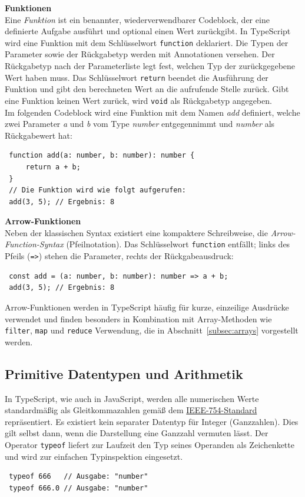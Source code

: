 \textbf{Funktionen}\\
Eine \textit{Funktion} ist ein benannter, wiederverwendbarer Codeblock, der eine definierte Aufgabe ausführt und optional einen Wert zurückgibt. In TypeScript wird eine Funktion mit dem Schlüsselwort \texttt{function} deklariert. Die Typen der Parameter sowie der Rückgabetyp werden mit Annotationen versehen. Der Rückgabetyp nach der Parameterliste legt fest, welchen Typ der zurückgegebene Wert haben muss. Das Schlüsselwort \texttt{return} beendet die Ausführung der Funktion und gibt den berechneten Wert an die aufrufende Stelle zurück. Gibt eine Funktion keinen Wert zurück, wird \texttt{void} als Rückgabetyp angegeben.\\
Im folgenden Codeblock wird eine Funktion mit dem Namen \emph{add} definiert, welche zwei Parameter \emph{a} und \emph{b} vom Type \emph{number} entgegennimmt und \emph{number} als Rückgabewert hat:
\begin{verbatim}
 function add(a: number, b: number): number {
     return a + b;
 }
 // Die Funktion wird wie folgt aufgerufen:
 add(3, 5); // Ergebnis: 8
\end{verbatim}


\textbf{Arrow-Funktionen}\\
Neben der klassischen Syntax existiert eine kompaktere Schreibweise, die \textit{Arrow-Function-Syntax} (Pfeilnotation). Das Schlüsselwort \texttt{function} entfällt; links des Pfeils (\texttt{=>}) stehen die Parameter, rechts der Rückgabeausdruck:
\begin{verbatim}
 const add = (a: number, b: number): number => a + b;
 add(3, 5); // Ergebnis: 8
\end{verbatim}

Arrow-Funktionen werden in TypeScript häufig für kurze, einzeilige Ausdrücke verwendet und finden besonders in Kombination mit Array-Methoden wie \texttt{filter}, \texttt{map} und \texttt{reduce} Verwendung, die in Abschnitt~\ref{subsec:arrays} vorgestellt werden.


\subsection{Primitive Datentypen und Arithmetik}
\label{subsec:arithmetik}
In TypeScript, wie auch in JavaScript, werden alle numerischen Werte standardmäßig als Gleitkommazahlen gemäß dem \href{https://de.wikipedia.org/wiki/IEEE_754}{IEEE-754-Standard} repräsentiert. Es existiert kein separater Datentyp für Integer (Ganzzahlen). Dies gilt selbst dann, wenn die Darstellung eine Ganzzahl vermuten lässt. Der Operator \texttt{typeof} liefert zur Laufzeit den Typ seines Operanden als Zeichenkette und wird zur einfachen Typinspektion eingesetzt.
\begin{verbatim}
 typeof 666   // Ausgabe: "number"
 typeof 666.0 // Ausgabe: "number"
\end{verbatim}

